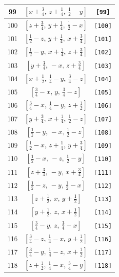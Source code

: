\documentclass[fleqn,8pt]{jsarticle}
\begin{document}
\begin{longtable}{ccc}
99 & $\left[ x + \frac{3}{4},\, z + \frac{1}{4},\, \frac{1}{2} - y \right]$ & {\tt [99]} \\ \hline
100 & $\left[ z + \frac{3}{4},\, y + \frac{1}{4},\, \frac{1}{2} - x \right]$ & {\tt [100]} \\ \hline
101 & $\left[ \frac{1}{2} - z,\, y + \frac{1}{4},\, x + \frac{3}{4} \right]$ & {\tt [101]} \\ \hline
102 & $\left[ \frac{1}{2} - y,\, x + \frac{1}{4},\, z + \frac{3}{4} \right]$ & {\tt [102]} \\ \hline
103 & $\left[ y + \frac{3}{4},\, - x,\, z + \frac{3}{4} \right]$ & {\tt [103]} \\ \hline
104 & $\left[ x + \frac{1}{2},\, \frac{1}{4} - y,\, \frac{3}{4} - z \right]$ & {\tt [104]} \\ \hline
105 & $\left[ \frac{3}{4} - x,\, y,\, \frac{3}{4} - z \right]$ & {\tt [105]} \\ \hline
106 & $\left[ \frac{3}{4} - x,\, \frac{1}{4} - y,\, z + \frac{1}{2} \right]$ & {\tt [106]} \\ \hline
107 & $\left[ y + \frac{3}{4},\, x + \frac{1}{4},\, \frac{1}{2} - z \right]$ & {\tt [107]} \\ \hline
108 & $\left[ \frac{1}{2} - y,\, - x,\, \frac{1}{2} - z \right]$ & {\tt [108]} \\ \hline
109 & $\left[ \frac{1}{2} - x,\, z + \frac{1}{4},\, y + \frac{3}{4} \right]$ & {\tt [109]} \\ \hline
110 & $\left[ \frac{1}{2} - x,\, - z,\, \frac{1}{2} - y \right]$ & {\tt [110]} \\ \hline
111 & $\left[ z + \frac{3}{4},\, - y,\, x + \frac{3}{4} \right]$ & {\tt [111]} \\ \hline
112 & $\left[ \frac{1}{2} - z,\, - y,\, \frac{1}{2} - x \right]$ & {\tt [112]} \\ \hline
113 & $\left[ z + \frac{1}{2},\, x,\, y + \frac{1}{2} \right]$ & {\tt [113]} \\ \hline
114 & $\left[ y + \frac{1}{2},\, z,\, x + \frac{1}{2} \right]$ & {\tt [114]} \\ \hline
115 & $\left[ \frac{3}{4} - y,\, z,\, \frac{3}{4} - x \right]$ & {\tt [115]} \\ \hline
116 & $\left[ \frac{3}{4} - z,\, \frac{1}{4} - x,\, y + \frac{1}{2} \right]$ & {\tt [116]} \\ \hline
117 & $\left[ \frac{3}{4} - y,\, \frac{1}{4} - z,\, x + \frac{1}{2} \right]$ & {\tt [117]} \\ \hline
118 & $\left[ z + \frac{1}{2},\, \frac{1}{4} - x,\, \frac{3}{4} - y \right]$ & {\tt [118]} \\ \hline

\end{longtable}
\end{document}

